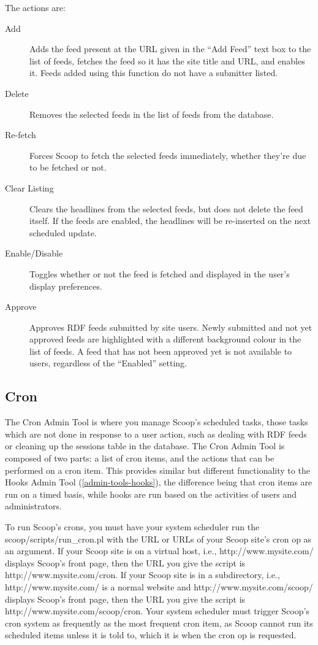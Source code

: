 The actions are:

\begin{description}
\item[Add] Adds the feed present at the URL given in the ``Add Feed'' text box to the list of feeds, fetches the feed so it has the site title and URL, and enables it.  Feeds added using this function do not have a submitter listed.
\item[Delete] Removes the selected feeds in the list of feeds from the database.
\item[Re-fetch] Forces Scoop to fetch the selected feeds immediately, whether they're due to be fetched or not.
\item[Clear Listing] Clears the headlines from the selected feeds, but does not delete the feed itself.  If the feeds are enabled, the headlines will be re-inserted on the next scheduled update.
\item[Enable/Disable] Toggles whether or not the feed is fetched and displayed in the user's display preferences.
\item[Approve] Approves RDF feeds submitted by site users.  Newly submitted and not yet approved feeds are highlighted with a different background colour in the list of feeds.  A feed that has not been approved yet is not available to users, regardless of the ``Enabled'' setting.
\end{description}

\subsection{Cron}
\label{admin-tools-cron}

The Cron Admin Tool is where you manage Scoop's scheduled tasks, those tasks which are not done in response to a user action, such as dealing with RDF feeds or cleaning up the sessions table in the database.  The Cron Admin Tool is composed of two parts: a list of cron items, and the actions that can be performed on a cron item. This provides similar but different functionality to the Hooks Admin Tool (\ref{admin-tools-hooks}), the difference being that cron items are run on a timed basis, while hooks are run based on the activities of users and administrators.

To run Scoop's crons, you must have your system scheduler run the scoop/scripts/run\_cron.pl with the URL or URLs of your Scoop site's cron op as an argument.  If your Scoop site is on a virtual host, i.e., http://www.mysite.com/ displays Scoop's front page, then the URL you give the script is http://www.mysite.com/cron.  If your Scoop site is in a subdirectory, i.e., http://www.mysite.com/ is a normal website and http://www.mysite.com/scoop/ displays Scoop's front page, then the URL you give the script is http://www.mysite.com/scoop/cron.  Your system scheduler must trigger Scoop's cron system as frequently as the most frequent cron item, as Scoop cannot run its scheduled items unless it is told to, which it is when the cron op is requested.

